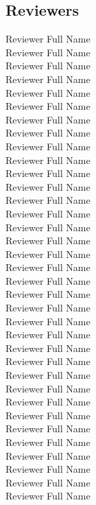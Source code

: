 \subsection{Reviewers}
\begin{multicols}{3}
Reviewer Full Name\\
Reviewer Full Name\\
Reviewer Full Name\\
Reviewer Full Name\\
Reviewer Full Name\\
Reviewer Full Name\\
Reviewer Full Name\\
Reviewer Full Name\\
Reviewer Full Name\\
Reviewer Full Name\\
Reviewer Full Name\\
Reviewer Full Name\\
Reviewer Full Name\\
Reviewer Full Name\\
Reviewer Full Name\\
Reviewer Full Name\\
Reviewer Full Name\\
Reviewer Full Name\\
Reviewer Full Name\\
Reviewer Full Name\\
Reviewer Full Name\\
Reviewer Full Name\\
Reviewer Full Name\\
Reviewer Full Name\\
Reviewer Full Name\\
Reviewer Full Name\\
Reviewer Full Name\\
Reviewer Full Name\\
Reviewer Full Name\\
Reviewer Full Name\\
Reviewer Full Name\\
Reviewer Full Name\\
Reviewer Full Name\\
Reviewer Full Name\\
Reviewer Full Name\\
\end{multicols}
